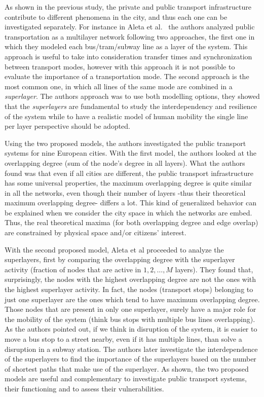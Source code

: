 As shown in the previous study, the private and public transport infrastructure contribute to different phenomena in the city, and thus each one can be investigated separately. For instance in Aleta et al.~\cite{Aleta2017Multilayer} the authors analyzed public transportation as a multilayer network following two approaches, the first one in which they modeled each bus/tram/subway line as a layer of the system. This approach is useful to take into consideration transfer times and synchronization between transport modes, however with this approach it is not possible to evaluate the importance of a transportation mode. The second approach is the most common one, in which all lines of the same mode are combined in a \textit{superlayer}. The authors approach was to use both modelling options, they showed that the \textit{superlayers} are fundamental to study the interdependency and resilience of the system while to have a realistic model of human mobility the single line per layer perspective should be adopted.

Using the two proposed models, the authors investigated the public transport systems for nine European cities. With the first model, the authors looked at the overlapping degree (sum of the node's degree in all layers). What the authors found was that even if all cities are different, the public transport infrastructure has some universal properties, the maximum overlapping degree is quite similar in all the networks, even though their number of layers -thus their theoretical maximum overlapping degree- differs a lot. This kind of generalized behavior can be explained when we consider the city space in which the networks are embed. Thus, the real theoretical maxima (for both overlapping degree and edge overlap) are constrained by physical space and/or citizens' interest.

With the second proposed model, Aleta et al \cite{aleta2017transportation} proceeded to analyze the superlayers, first by comparing the overlapping degree with the superlayer activity (fraction of nodes that are active in $1, 2, \dots, M$ layers). They found that, surprisingly, the nodes with the highest overlapping degree are not the ones with the highest superlayer activity. In fact, the nodes (transport stops) belonging to just one superlayer are the ones which tend to have maximum overlapping degree. Those nodes that are present in only one superlayer, surely have a major role for the mobility of the system (think bus stops with multiple bus lines overlapping). As the authors pointed out, if we think in disruption of the system, it is easier to move a bus stop to a street nearby, even if it has multiple lines, than solve a disruption in a subway station. The authors later investigate the interdependence of the superlayers to find the importance of the superlayers based on the number of shortest paths that make use of the superlayer. As shown, the two proposed models are useful and complementary to investigate public transport systems, their functioning and to assess their vulnerabilities. 

